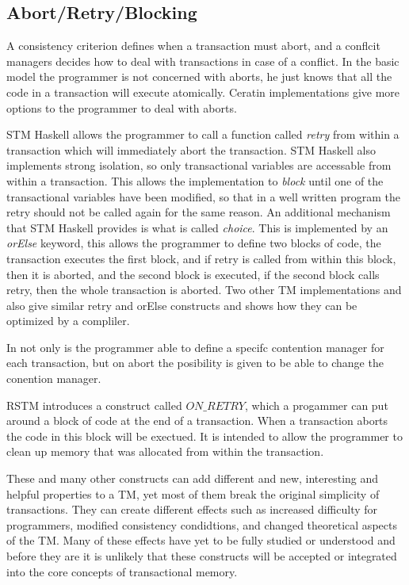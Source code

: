 \subsection{Abort/Retry/Blocking}
A consistency criterion defines when a transaction must abort, and a conflcit managers decides how to deal with transactions in case of a conflict.
In the basic model the programmer is not concerned with aborts, he just knows that all the code in a transaction will execute atomically.
Ceratin implementations give more options to the programmer to deal with aborts.

STM Haskell \cite{sjbc000} allows the programmer to call a function called \emph{retry} from within a transaction which will immediately abort the transaction.
STM Haskell also implements strong isolation, so only transactional variables are accessable from within a transaction.
This allows the implementation to \emph{block} until one of the transactional variables have been modified, so that in a well written program the retry should not be called again for the same reason.
An additional mechanism that STM Haskell provides is what is called \emph{choice}.
This is implemented by an \emph{orElse} keyword, this allows the programmer to define two blocks of code, the transaction executes the first block, and if retry is called from within this block, then it is aborted, and the second block is executed, if the second block calls retry, then the whole transaction is aborted.
Two other TM implementations \cite{1133985} and \cite{1123001} also give similar retry and orElse constructs and \cite{1133985} shows how they can be optimized by a compliler.

In \cite{guerraoui05polymorphic/LPD} not only is the programmer able to define a specifc contention manager for each transaction, but on abort the posibility is given to be able to change the conention manager.

RSTM \cite{Marathe06loweringthe} introduces a construct called \emph{$ON\_RETRY$}, which a progammer can put around a block of code at the end of a transaction.
When a transaction aborts the code in this block will be exectued.
It is intended to allow the programmer to clean up memory that was allocated from within the transaction.

These and many other constructs can add different and new, interesting and helpful properties to a TM, yet most of them break the original simplicity of transactions.
They can create different effects such as increased difficulty for programmers, modified consistency condidtions, and changed theoretical aspects of the TM.
Many of these effects have yet to be fully studied or understood and before they are it is unlikely that these constructs will be accepted or integrated into the core concepts of transactional memory.

